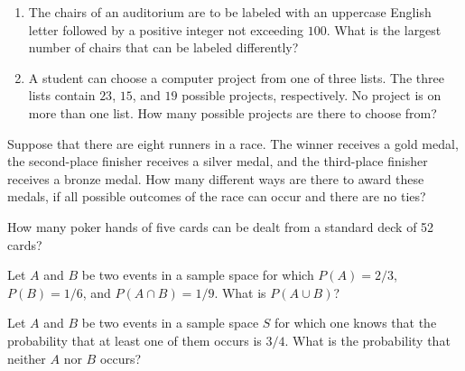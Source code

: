 \documentclass[12pt,reqno]{amsart}
\begin{document}
\bigskip
\prob

\begin{enumerate}
\item The chairs of an auditorium are to be labeled with an uppercase English letter followed by a positive integer not exceeding $100$. What is the largest number of chairs that can be labeled differently?\vfill
\item A student can choose a computer project from one of three lists. The three lists contain $23$, $15$, and $19$ possible projects, respectively. No project is on more than one list. How many possible projects are there to choose from?\vfill
\end{enumerate}









\bigskip
\prob Suppose that there are eight runners in a race. The winner receives a gold medal, the second-place finisher receives a silver medal, and the third-place finisher receives a bronze medal. How many different ways are there to award these medals, if all possible outcomes of the race can occur and there are no ties?\vfill










\prob How many poker hands of five cards can be dealt from a standard deck of 52 cards? \vfill











\newpage
\prob Let $A$ and $B$ be two events in a sample space for which $P(A) = 2/3$, $P(B) = 1/6$, and $P(A \cap B) = 1/9$. What is $P(A \cup B)$?\vfill


















\bigskip
\prob Let $A$ and $B$ be two events in a sample space $S$ for which one knows that the probability that at least one of them occurs is $3/4$. What is the probability that neither $A$ nor $B$ occurs?\vfill
\end{document}
